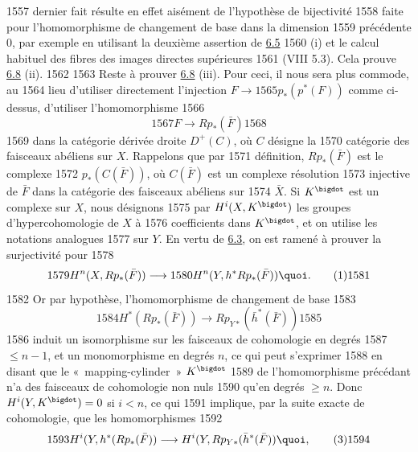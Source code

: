   1557	dernier fait résulte en effet aisément de l'hypothèse de bijectivité
  1558	faite pour l'homomorphisme de changement de base dans la dimension
  1559	précédente 0, par exemple en utilisant la deuxième assertion de \hyperref[XII.prop6.5]{6.5}
  1560	(i) et le calcul habituel des fibres des images directes supérieures
  1561	(VIII 5.3). Cela prouve \hyperref[XII.prop6.8]{6.8} (ii).
  1562	
  1563	Reste à prouver \hyperref[XII.prop6.8]{6.8} (iii). Pour ceci, il nous sera plus commode, au
  1564	lieu d'utiliser directement l'injection $F\rightarrow
  1565	p_{\ast}(p^{\ast}(F))$ comme ci-dessus, d'utiliser l'homomorphisme
  1566	$$
  1567	F\longrightarrow Rp_{\ast}(\bar{F})
  1568	$$
  1569	dans la catégorie dérivée droite $D^{+}(C)$, où $C$ désigne la
  1570	catégorie des faisceaux abéliens sur $X$. Rappelons que par
  1571	définition, $Rp_{\ast}(\bar{F})$ est le complexe
  1572	$p_{\ast}(C(\bar{F}))$, où $C(\bar{F})$ est un complexe résolution
  1573	injective de $\bar{F}$ dans la catégorie des faisceaux abéliens sur
  1574	$\bar{X}$. Si $K^{\bigdot}$ est un complexe sur $X$, nous désignons
  1575	par $H^{i}(X,K^{\bigdot})$ les groupes d'hypercohomologie de $X$ à
  1576	coefficients dans $K^{\bigdot}$, et on utilise les notations analogues
  1577	sur $Y$. En vertu de \hyperref[XII.cor6.3]{6.3}, on est ramené à prouver la surjectivité pour
  1578	\begin{equation*}
  1579	H^n(X,Rp_{\ast}(\bar{F}))\longrightarrow
  1580	H^n(Y,h^{\ast}Rp_{\ast}(\bar{F})){\quoi}.\tag{1}
  1581	\end{equation*}
  1582	Or par hypothèse, l'homomorphisme de changement de base
  1583	\begin{equation*}
  1584	H^{\ast}(Rp_{\ast}(\bar{F}))\longrightarrow Rp_{Y\ast}(\bar{h}^{\ast}(\bar{F}))\tag{2}
  1585	\end{equation*}
  1586	induit un isomorphisme sur les faisceaux de cohomologie en degrés
  1587	$\leq n-1$, et un monomorphisme en degrés $n$, ce qui peut s'exprimer
  1588	en disant que le « mapping-cylinder » \pageoriginale $K^{\bigdot}$
  1589	de l'homomorphisme précédant n'a des faisceaux de cohomologie non nuls
  1590	qu'en degrés $\geq n$. Donc $H^{i}(Y,K^{\bigdot})=0$ si $i<n$, ce qui
  1591	implique, par la suite exacte de cohomologie, que les homomorphismes
  1592	\begin{equation*}
  1593	H^{i}(Y,h^{\ast}(Rp_{\ast}(\bar{F}))\longrightarrow H^{i}(Y,Rp_{Y\ast}(\bar{h}^{\ast}(\bar{F})){\quoi},\tag{3}
  1594	\end{equation*}
